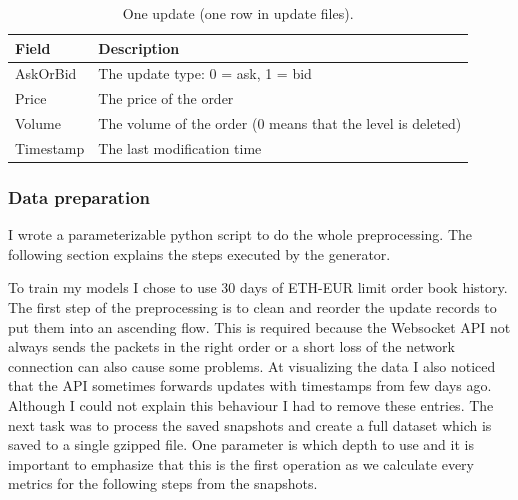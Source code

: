 \documentclass[11pt,a4paper,oneside]{article}
\begin{document}
\begin{table}[tbh]
  \centering
  \begin{tabular}{|l|l|}
    \hline
    Field       & Description \\
    \hline
    AskOrBid    & The update type: 0 = ask, 1 = bid \\
    \hline
    Price       & The price of the order \\
    \hline
    Volume      & The volume of the order (0 means that the level is deleted)\\
    \hline
    Timestamp   & The last modification time \\
    \hline
  \end{tabular}
  \caption{One update (one row in update files).}
  \label{table:2}
\end{table}

  \subsubsection{Data preparation}

  I wrote a parameterizable python script to do the whole preprocessing. The following section explains the steps 
  executed by the generator.

  To train my models I chose to use 30 days of ETH-EUR limit order book history. The first step of the preprocessing is 
  to clean and reorder the update records to put them into an ascending flow. This is required because the Websocket API 
  not always sends the packets in the right order or a short loss of the network connection can also cause some 
  problems. At visualizing the data I also noticed that the API sometimes forwards updates with timestamps from few days 
  ago. Although I could not explain this behaviour I had to remove these entries. The next task was to process the 
  saved snapshots and create a full dataset which is saved to a single gzipped file. One parameter is which depth to 
  use and it is important to emphasize that this is the first operation as we calculate every metrics for the following 
  steps from the snapshots.
\end{document}
